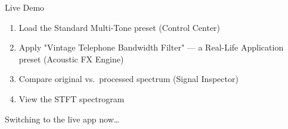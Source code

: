 \begin{frame}{Live Demo}
  \begin{enumerate}
    \item Load the \alert{Standard Multi-Tone} preset (Control Center)
    \item Apply \alert{"Vintage Telephone Bandwidth Filter"} --- a Real-Life Application preset (Acoustic FX Engine)
    \item Compare original vs.\ processed \alert{spectrum} (Signal Inspector)
    \item View the \alert{STFT spectrogram}
  \end{enumerate}
  \vspace{0.4cm}
  \centering
  {\Large\alert{Switching to the live app now\ldots}}
\end{frame}
